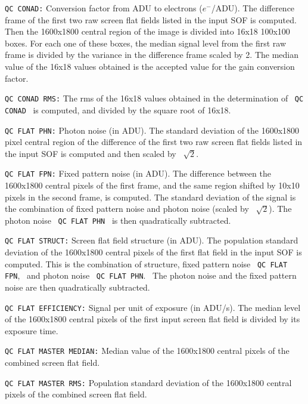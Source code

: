 \begin{description}
\begin{description}

\item {\tt QC CONAD:} Conversion factor from ADU to electrons ($e^-$/ADU). 
                   The difference frame of the first two raw screen flat
                   fields listed in the input SOF is computed. Then the 
                   1600x1800
                   central region of the image is divided into 16x18 100x100
                   boxes. For each one of these boxes, the median signal
                   level from the first raw frame is divided by the variance
                   in the difference frame scaled by 2. The median value of
                   the 16x18 values obtained is the accepted value for the
                   gain conversion factor.
\item {\tt QC CONAD RMS:} The rms of the 16x18 values obtained in the
                   determination of \ {\tt QC CONAD} \ is computed,
                   and divided by the square root of 16x18.
\item {\tt QC FLAT PHN:} Photon noise (in ADU). 
                   The standard deviation of the 1600x1800 pixel central 
                   region of the difference of the first two raw screen 
                   flat fields listed in the input SOF is computed and
                   then scaled by \ $\sqrt{2}$.
\item {\tt QC FLAT FPN:} Fixed pattern noise (in ADU).
                   The difference between the 1600x1800
                   central pixels of the first frame, and the same
                   region shifted by 10x10 pixels in the second frame,
                   is computed. The standard deviation of the signal 
                   is the combination of fixed pattern
                   noise and photon noise (scaled by \ $\sqrt{2}$). The photon
                   noise \ {\tt QC FLAT PHN} \ is then quadratically 
                   subtracted.
\item {\tt QC FLAT STRUCT:} Screen flat field structure (in ADU).
                   The population standard deviation of the
                   1600x1800 central pixels of the first flat field
                   in the input SOF is computed. This is the combination 
                   of structure, fixed pattern noise \ {\tt QC FLAT FPN}, \ 
                   and photon noise \ {\tt QC FLAT PHN}. \ The photon noise 
                   and the fixed pattern noise are then quadratically 
                   subtracted.
\item {\tt QC FLAT EFFICIENCY:} Signal per unit of exposure (in ADU/s).
                   The median level of the 1600x1800 central pixels of
                   the first input screen flat field is divided by its
                   exposure time.
\item {\tt QC FLAT MASTER MEDIAN:} Median value of the 1600x1800 central 
                   pixels of the combined screen flat field.
\item {\tt QC FLAT MASTER RMS:} Population standard deviation of the 
                   1600x1800 central pixels of the combined
                   screen flat field.


\end{description}
\end{description}
